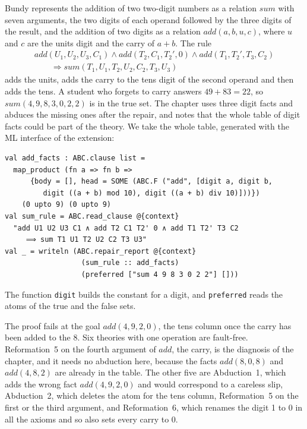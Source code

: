 \documentclass[preprint,12pt]{elsarticle}
\newcommand{\isa}[1]{\texttt{#1}}
\newcommand{\imp}{\Longrightarrow}
\begin{document}
Bundy represents the addition of two two-digit numbers as a relation
$\mathit{sum}$ with seven arguments, the two digits of each operand
followed by the three digits of the result, and the addition of two digits
as a relation $\mathit{add}(a, b, u, c)$, where $u$ and $c$ are the units
digit and the carry of $a + b$. The rule
\[
\begin{array}{l}
  \mathit{add}(U_1, U_2, U_3, C_1) \wedge \mathit{add}(T_2, C_1, T_2', 0)
  \wedge \mathit{add}(T_1, T_2', T_3, C_2) \\
  \qquad \imp \mathit{sum}(T_1, U_1, T_2, U_2, C_2, T_3, U_3)
\end{array}
\]
adds the units, adds the carry to the tens digit of the second operand and
then adds the tens. A student who forgets to carry answers $49 + 83 = 22$,
so $\mathit{sum}(4, 9, 8, 3, 0, 2, 2)$ is in the true set. The chapter uses
three digit facts and abduces the missing ones after the repair, and notes
that the whole table of digit facts could be part of the theory. We take
the whole table, generated with the ML interface of the extension:
\begin{lstlisting}
val add_facts : ABC.clause list =
  map_product (fn a => fn b =>
      {body = [], head = SOME (ABC.F ("add", [digit a, digit b,
         digit ((a + b) mod 10), digit ((a + b) div 10)]))})
    (0 upto 9) (0 upto 9)
val sum_rule = ABC.read_clause @{context}
  "add U1 U2 U3 C1 ∧ add T2 C1 T2' 0 ∧ add T1 T2' T3 C2
     ⟹ sum T1 U1 T2 U2 C2 T3 U3"
val _ = writeln (ABC.repair_report @{context}
                  (sum_rule :: add_facts)
                  (preferred ["sum 4 9 8 3 0 2 2"] []))
\end{lstlisting}
The function \isa{digit} builds the constant for a digit, and
\isa{preferred} reads the atoms of the true and the false sets.

The proof fails at the goal $\mathit{add}(4, 9, 2, 0)$, the tens column
once the carry has been added to the 8. Six theories with one operation are
fault-free. Reformation~5 on the fourth argument of $\mathit{add}$, the
carry, is the diagnosis of the chapter, and it needs no abduction here,
because the facts $\mathit{add}(8, 0, 8)$ and $\mathit{add}(4, 8, 2)$ are
already in the table. The other five are Abduction~1, which adds the wrong
fact $\mathit{add}(4, 9, 2, 0)$ and would correspond to a careless slip,
Abduction~2, which deletes the atom for the tens column, Reformation~5 on
the first or the third argument, and Reformation~6, which renames the digit
1 to 0 in all the axioms and so also sets every carry to 0.
\end{document}
